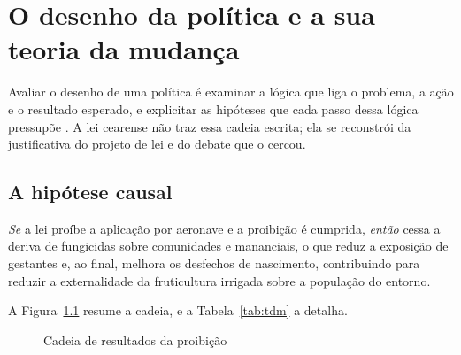 \chapter{O desenho da política e a sua teoria da mudança}
\label{sec:desenho}

Avaliar o desenho de uma política é examinar a lógica que liga o problema, a
ação e o resultado esperado, e explicitar as hipóteses que cada passo dessa
lógica pressupõe \cite{gertler2016}. A lei cearense não traz essa cadeia
escrita; ela se reconstrói da justificativa do projeto de lei e do debate que o
cercou.

\section{A hipótese causal}

\emph{Se} a lei proíbe a aplicação por aeronave e a proibição é cumprida,
\emph{então} cessa a deriva de fungicidas sobre comunidades e mananciais, o que
reduz a exposição de gestantes e, ao final, melhora os desfechos de nascimento,
contribuindo para reduzir a externalidade da fruticultura irrigada sobre a
população do entorno.

A Figura~\ref{fig:cadeia} resume a cadeia, e a Tabela~\ref{tab:tdm} a detalha.

\begin{figure}[ht]
\centering
\caption{Cadeia de resultados da proibição}
\label{fig:cadeia}
\end{figure}

